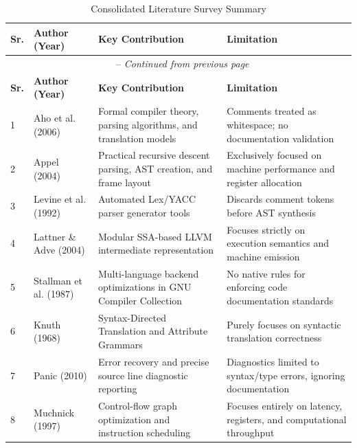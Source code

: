 \begin{longtable}{|p{0.6cm}|p{3.2cm}|p{5.4cm}|p{5.4cm}|}
\caption{Consolidated Literature Survey Summary} \label{tab:litreview} \\
\hline
\textbf{Sr.} & \textbf{Author (Year)} & \textbf{Key Contribution} & \textbf{Limitation} \\
\hline
\endfirsthead
\multicolumn{4}{c}{\tablename\ \thetable{} -- \textit{Continued from previous page}} \\
\hline
\textbf{Sr.} & \textbf{Author (Year)} & \textbf{Key Contribution} & \textbf{Limitation} \\
\hline
\endhead
\hline
\endfoot

1 & Aho et al. (2006) \cite{aho2006compilers} & Formal compiler theory, parsing algorithms, and translation models & Comments treated as whitespace; no documentation validation \\ \hline

2 & Appel (2004) \cite{appel2004modern} & Practical recursive descent parsing, AST creation, and frame layout & Exclusively focused on machine performance and register allocation \\ \hline

3 & Levine et al. (1992) \cite{levine1992lex} & Automated Lex/YACC parser generator tools & Discards comment tokens before AST synthesis \\ \hline

4 & Lattner \& Adve (2004) \cite{lattner2004llvm} & Modular SSA-based LLVM intermediate representation & Focuses strictly on execution semantics and machine emission \\ \hline

5 & Stallman et al. (1987) \cite{stallman1987gcc} & Multi-language backend optimizations in GNU Compiler Collection & No native rules for enforcing code documentation standards \\ \hline

6 & Knuth (1968) \cite{knuth1968semantics} & Syntax-Directed Translation and Attribute Grammars & Purely focuses on syntactic translation correctness \\ \hline

7 & Panic (2010) \cite{panic2010error} & Error recovery and precise source line diagnostic reporting & Diagnostics limited to syntax/type errors, ignoring documentation \\ \hline

8 & Muchnick (1997) \cite{muchnick1997advanced} & Control-flow graph optimization and instruction scheduling & Focuses entirely on latency, registers, and computational throughput \\ \hline


\end{longtable}
